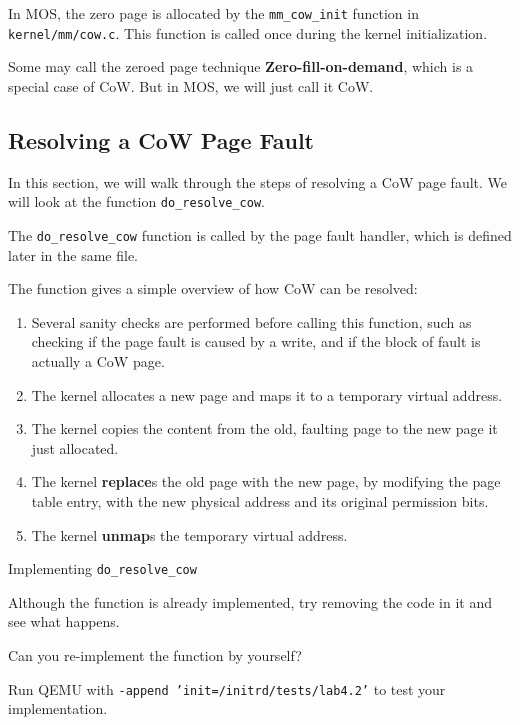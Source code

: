 In MOS, the zero page is allocated by the \texttt{mm\_cow\_init} function in
\texttt{kernel/mm/cow.c}. This function is called once during the kernel
initialization.

\begin{note}
    \item Some may call the zeroed page technique \textbf{Zero-fill-on-demand},
    which is a special case of CoW. But in MOS, we will just call it CoW.
\end{note}


\subsection{Resolving a CoW Page Fault}

In this section, we will walk through the steps of resolving a CoW page fault.
We will look at the function \texttt{do\_resolve\_cow}.

\begin{note}
    \item The \texttt{do\_resolve\_cow} function is called by the page fault
    handler, which is defined later in the same file.
\end{note}

The function gives a simple overview of how CoW can be resolved:

\begin{enumerate}
    \item Several sanity checks are performed before calling this function,
          such as checking if the page fault is caused by a write, and if the
          block of fault is actually a CoW page.
    \item The kernel allocates a new page and maps it to a temporary virtual
          address.
    \item The kernel copies the content from the old, faulting page to the new
          page it just allocated.
    \item The kernel \textbf{replace}s the old page with the new page, by
          modifying the page table entry, with the new physical address and
          its original permission bits.
    \item The kernel \textbf{unmap}s the temporary virtual address.
\end{enumerate}

\begin{exercise*}{Implementing \texttt{do\_resolve\_cow}}
    \item Although the function is already implemented, try removing
    the code in it and see what happens.
    \item Can you re-implement the function by yourself?

    Run QEMU with \texttt{-append 'init=/initrd/tests/lab4.2'} to test your
    implementation.
\end{exercise*}

